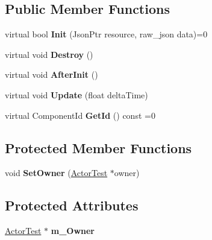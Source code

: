 \subsection*{Public Member Functions}
\begin{DoxyCompactItemize}
\item 
\mbox{\label{classTarbora_1_1ActorComponent_a55d053ca98c31bd3f79f005888b7e428}} 
virtual bool {\bfseries Init} (Json\+Ptr resource, raw\+\_\+json data)=0
\item 
\mbox{\label{classTarbora_1_1ActorComponent_a940239e984904afe67fc63a70e1be1ec}} 
virtual void {\bfseries Destroy} ()
\item 
\mbox{\label{classTarbora_1_1ActorComponent_ad9139206456b2f466509c35111706b7e}} 
virtual void {\bfseries After\+Init} ()
\item 
\mbox{\label{classTarbora_1_1ActorComponent_a1819cca7b2392047d95614b2c71cb56e}} 
virtual void {\bfseries Update} (float delta\+Time)
\item 
\mbox{\label{classTarbora_1_1ActorComponent_a395c55c7c250466e3c037fa4090da5d5}} 
virtual Component\+Id {\bfseries Get\+Id} () const =0
\end{DoxyCompactItemize}
\subsection*{Protected Member Functions}
\begin{DoxyCompactItemize}
\item 
\mbox{\label{classTarbora_1_1ActorComponent_abf8b7b050e3777624e42336cc661b106}} 
void {\bfseries Set\+Owner} (\hyperlink{classTarbora_1_1ActorTest}{Actor\+Test} $\ast$owner)
\end{DoxyCompactItemize}
\subsection*{Protected Attributes}
\begin{DoxyCompactItemize}
\item 
\mbox{\label{classTarbora_1_1ActorComponent_aa1f0c0a35625fe1a16dcb1f0ee67d7e9}} 
\hyperlink{classTarbora_1_1ActorTest}{Actor\+Test} $\ast$ {\bfseries m\+\_\+\+Owner}
\end{DoxyCompactItemize}
